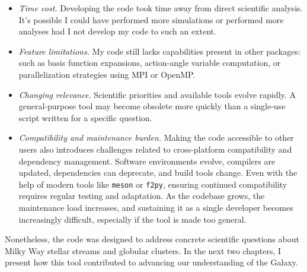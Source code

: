         \begin{itemize}
            \item \textit{Time cost.} Developing the code took time away from direct scientific analysis. It's possible I could have performed more simulations or performed more analyses had I not develop my code to such an extent.
            \item \textit{Feature limitations.} My code still lacks capabilities present in other packages: such as basis function expansions, action-angle variable computation, or parallelization strategies using MPI or OpenMP.
            \item \textit{Changing relevance.} Scientific priorities and available tools evolve rapidly. A general-purpose tool may become obsolete more quickly than a single-use script written for a specific question.
            \item \textit{Compatibility and maintenance burden.} Making the code accessible to other users also introduces challenges related to cross-platform compatibility and dependency management. Software environments evolve, compilers are updated, dependencies can deprecate, and build tools change. Even with the help of modern tools like \texttt{meson} or \texttt{f2py}, ensuring continued compatibility requires regular testing and adaptation. As the codebase grows, the maintenance load increases, and sustaining it as a single developer becomes increasingly difficult, especially if the tool is made too general.
        \end{itemize}
        Nonetheless, the code was designed to address concrete scientific questions about Milky Way stellar streams and globular clusters. In the next two chapters, I present how this tool contributed to advancing our understanding of the Galaxy.
